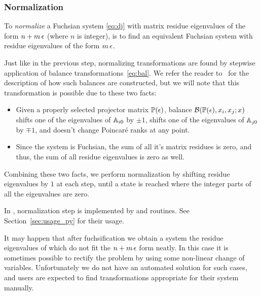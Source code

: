\documentclass[12pt,a4paper]{article}
\begin{document}


\subsubsection{Normalization}
\label{sec:norm}

To \textit{normalize} a Fuchsian system \eqref{eq:dj} with matrix residue eigenvalues of the form $n+m\,\epsilon$ (where $n$ is integer), is to find an equivalent Fuchsian system with residue eigenvalues of the form $m\,\epsilon$.

Just like in the previous step, normalizing transformations are found by stepwise application of balance transformations~\eqref{eq:bal}.
We refer the reader to~\cite[p.~11]{Lee15} for the description of how such balances are constructed, but we will note that this transformation is possible due to these two facts:
\begin{itemize}
    \item Given a properly selected projector matrix $\mathbb{P}(\epsilon)$, balance $\mathcal{B}(\mathbb{P}(\epsilon), x_i, x_j; x)$ shifts one of the eigenvalues of $\mathbb{A}_{i0}$ by $\pm1$, shifts one of the eigenvalues of $\mathbb{A}_{j0}$ by $\mp1$, and doesn't change Poincar\'e ranks at any point.
    \item Since the system is Fuchsian, the sum of all it's matrix residues is zero, and thus, the sum of all residue eigenvalues is zero as well.
\end{itemize}
Combining these two facts, we perform normalization by shifting residue eigenvalues by $1$ at each step, until a state is reached where the integer parts of all the eigenvalues are zero.

In \fuchsia, normalization step is implemented by  and  routines.
See Section~\ref{sec:usage_py} for their usage.

It may happen that after fuchsification we obtain a system the residue eigenvalues of which do not fit the $n+m\,\epsilon$ form neatly.
In this case it is sometimes possible to rectify the problem by using some non-linear change of variables.
Unfortunately we do not have an automated solution for such cases, and users are expected to find transformations appropriate for their system manually.
\end{document}
